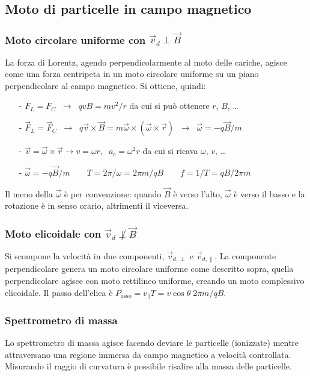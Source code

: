 \documentclass[a4paper]{article}
\begin{document}
\subsection{Moto di particelle in campo magnetico}
\subsubsection*{Moto circolare uniforme con \(\vec{v}_d \perp \vec{B}\)}
La forza di Lorentz, agendo perpendicolarmente al moto delle cariche, agisce come una forza centripeta in un moto circolare uniforme
su un piano perpendicolare al campo magnetico. Si ottiene, quindi:
\begin{itemize}[topsep=3pt, itemsep=0pt]
	\item[-] \(F_L = F_C \;\;\rightarrow\;\; qvB = mv^2/r\) da cui si può ottenere \(r\), \(B\), \dots
	\item[-] \(\vec{F}_L = \vec{F}_C \;\;\rightarrow\;\; q \vec{v} \times \vec{B} = m \vec{\omega} \times (\vec{\omega} \times \vec{r}) \;\;\rightarrow\;\; \vec{\omega} = -q\vec{B}/m\)
	\item[-] \(\vec{v} = \vec{\omega} \times \vec{r} \rightarrow v = \omega r, \;\; a_c = \omega^2 r\) da cui si ricava \(\omega\), \(v\), \dots
	\item[-] \(\vec{\omega} = -q\vec{B}/m \qquad T = 2 \pi / \omega = 2\pi m / q B \qquad f = 1/T = qB/2\pi m\)
\end{itemize}
Il meno della \(\vec{\omega}\) è per convenzione: quando \(\vec{B}\) è verso l'alto, \(\vec{\omega}\) è verso il basso e la
rotazione è in senso orario, altrimenti il viceversa.

\subsubsection*{Moto elicoidale con \(\vec{v}_d \not\perp \vec{B}\)}
Si scompone la velocità in due componenti, \(\vec{v}_{d,\perp}\) e \(\vec{v}_{d,\parallel}\). La componente perpendicolare genera
un moto circolare uniforme come descritto sopra, quella perpendicolare agisce con moto rettilineo uniforme, creando un moto
complessivo elicoidale. Il passo dell'elica è \(P_\text{asso} = v_\parallel T = v \cos \theta \; 2 \pi m/qB\).

\subsubsection*{Spettrometro di massa}
Lo spettrometro di massa agisce facendo deviare le particelle (ionizzate) mentre attraversano una regione immersa da campo
magnetico a velocità controllata. Misurando il raggio di curvatura è possibile risalire alla massa delle particelle.
\end{document}
